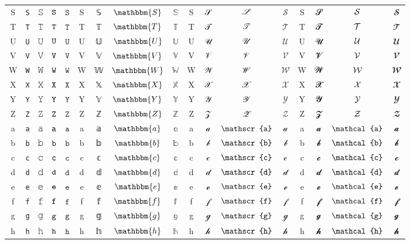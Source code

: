 \documentclass[10pt]{standalone}
\newcommand{\TT}[1]{\ifmmode\mathtt{#1}\else\texttt{#1}\fi}
\newcommand{\BB}[1]{\ifmmode\mathbbm{#1}\else#1\fi}
\newcommand{\SCR}[1]{\ifmmode\mathscr{#1}\else#1\fi}
\newcommand{\CAL}[1]{\ifmmode\mathcal{#1}\else#1\fi}
\begin{document}
\begin{tabular}{c|cc|cc|cc|cc|cc|cc|cc|cc}
S & \TT{S} & 𝚂 & $\TT{S}$ & $𝚂$ & \BB{S} & 𝕊 & $\BB{S}$ & $𝕊$ & \SCR{S} & 𝒮 & $\SCR{S}$ & $𝒮$ & \CAL{S} & 𝓢 & $\CAL{S}$ & $𝓢$ \\
T & \TT{T} & 𝚃 & $\TT{T}$ & $𝚃$ & \BB{T} & 𝕋 & $\BB{T}$ & $𝕋$ & \SCR{T} & 𝒯 & $\SCR{T}$ & $𝒯$ & \CAL{T} & 𝓣 & $\CAL{T}$ & $𝓣$ \\
U & \TT{U} & 𝚄 & $\TT{U}$ & $𝚄$ & \BB{U} & 𝕌 & $\BB{U}$ & $𝕌$ & \SCR{U} & 𝒰 & $\SCR{U}$ & $𝒰$ & \CAL{U} & 𝓤 & $\CAL{U}$ & $𝓤$ \\
V & \TT{V} & 𝚅 & $\TT{V}$ & $𝚅$ & \BB{V} & 𝕍 & $\BB{V}$ & $𝕍$ & \SCR{V} & 𝒱 & $\SCR{V}$ & $𝒱$ & \CAL{V} & 𝓥 & $\CAL{V}$ & $𝓥$ \\
W & \TT{W} & 𝚆 & $\TT{W}$ & $𝚆$ & \BB{W} & 𝕎 & $\BB{W}$ & $𝕎$ & \SCR{W} & 𝒲 & $\SCR{W}$ & $𝒲$ & \CAL{W} & 𝓦 & $\CAL{W}$ & $𝓦$ \\
X & \TT{X} & 𝚇 & $\TT{X}$ & $𝚇$ & \BB{X} & 𝕏 & $\BB{X}$ & $𝕏$ & \SCR{X} & 𝒳 & $\SCR{X}$ & $𝒳$ & \CAL{X} & 𝓧 & $\CAL{X}$ & $𝓧$ \\
Y & \TT{Y} & 𝚈 & $\TT{Y}$ & $𝚈$ & \BB{Y} & 𝕐 & $\BB{Y}$ & $𝕐$ & \SCR{Y} & 𝒴 & $\SCR{Y}$ & $𝒴$ & \CAL{Y} & 𝓨 & $\CAL{Y}$ & $𝓨$ \\
Z & \TT{Z} & 𝚉 & $\TT{Z}$ & $𝚉$ & \BB{Z} & ℤ & $\BB{Z}$ & $ℤ$ & \SCR{Z} & 𝒵 & $\SCR{Z}$ & $𝒵$ & \CAL{Z} & 𝓩 & $\CAL{Z}$ & $𝓩$ \\
\midrule%
a & \TT{a} & 𝚊 & $\TT{a}$ & $𝚊$ & \BB{a} & 𝕒 & $\BB{a}$ & $𝕒$ & \SCR{a} & 𝒶 & $\SCR{a}$ & $𝒶$ & \CAL{a} & 𝓪 & $\CAL{a}$ & $𝓪$ \\
b & \TT{b} & 𝚋 & $\TT{b}$ & $𝚋$ & \BB{b} & 𝕓 & $\BB{b}$ & $𝕓$ & \SCR{b} & 𝒷 & $\SCR{b}$ & $𝒷$ & \CAL{b} & 𝓫 & $\CAL{b}$ & $𝓫$ \\
c & \TT{c} & 𝚌 & $\TT{c}$ & $𝚌$ & \BB{c} & 𝕔 & $\BB{c}$ & $𝕔$ & \SCR{c} & 𝒸 & $\SCR{c}$ & $𝒸$ & \CAL{c} & 𝓬 & $\CAL{c}$ & $𝓬$ \\
d & \TT{d} & 𝚍 & $\TT{d}$ & $𝚍$ & \BB{d} & 𝕕 & $\BB{d}$ & $𝕕$ & \SCR{d} & 𝒹 & $\SCR{d}$ & $𝒹$ & \CAL{d} & 𝓭 & $\CAL{d}$ & $𝓭$ \\
e & \TT{e} & 𝚎 & $\TT{e}$ & $𝚎$ & \BB{e} & 𝕖 & $\BB{e}$ & $𝕖$ & \SCR{e} & ℯ & $\SCR{e}$ & $ℯ$ & \CAL{e} & 𝓮 & $\CAL{e}$ & $𝓮$ \\
f & \TT{f} & 𝚏 & $\TT{f}$ & $𝚏$ & \BB{f} & 𝕗 & $\BB{f}$ & $𝕗$ & \SCR{f} & 𝒻 & $\SCR{f}$ & $𝒻$ & \CAL{f} & 𝓯 & $\CAL{f}$ & $𝓯$ \\
g & \TT{g} & 𝚐 & $\TT{g}$ & $𝚐$ & \BB{g} & 𝕘 & $\BB{g}$ & $𝕘$ & \SCR{g} & ℊ & $\SCR{g}$ & $ℊ$ & \CAL{g} & 𝓰 & $\CAL{g}$ & $𝓰$ \\
h & \TT{h} & 𝚑 & $\TT{h}$ & $𝚑$ & \BB{h} & 𝕙 & $\BB{h}$ & $𝕙$ & \SCR{h} & 𝒽 & $\SCR{h}$ & $𝒽$ & \CAL{h} & 𝓱 & $\CAL{h}$ & $𝓱$ \\

\end{tabular}
\end{document}
